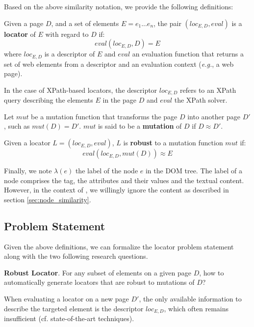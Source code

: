 
Based on the above similarity notation, we provide the following definitions:
\begin{defn}\label{loc_def}
    Given a page $D$, and a set of elements $E = {e_1...e_n}$, the pair $(loc_{E,D}, eval)$ is a \textbf{locator} of $E$ with regard to $D$ if:
    \begin{equation}
       eval(loc_{E,D}, D) = E
    \end{equation}
    where $loc_{E,D}$ is a descriptor of $E$ and $eval$ an evaluation function that returns a set of web elements from a descriptor and an evaluation context (\emph{e.g.}, a web page).
\end{defn}
In the case of XPath-based locators, the descriptor $loc_{E,D}$ refers to an XPath query describing the elements $E$ in the page $D$ and $eval$ the XPath solver.

\begin{defn}
    Let $mut$ be a mutation function that transforms the page $D$ into another page $D'$, such as $mut(D) = D'$.
    $mut$ is said to be a \textbf{mutation} of $D$ if $D \approx D'$.
\end{defn}

\begin{defn}
    Given a locator $L = (loc_{E,D}, eval)$, $L$ is \textbf{robust} to a mutation function $mut$ if:
    \begin{equation}
       eval(loc_{E, D}, mut(D)) \approx E
    \end{equation}
\end{defn}

Finally, we note $\lambda(e)$ the label of the node $e$ in the DOM tree. The label of a node comprises the tag, the attributes and their values and the textual content. However, in the context of \erratum, we willingly ignore the content as described in section \ref{sec:node_similarity}.

\subsection{Problem Statement}
Given the above definitions, we can formalize the locator problem statement along with the two following research questions.
\begin{rqn}\label{robust_locator_problem} %
    \textbf{Robust Locator}. 
    For any subset of elements on a given page $D$, how to automatically generate locators that are robust to mutations of $D$?
\end{rqn}
When evaluating a locator on a new page $D'$, the only available information to describe the targeted element is the descriptor $loc_{E,D}$, which often remains insufficient (cf. state-of-the-art techniques).

